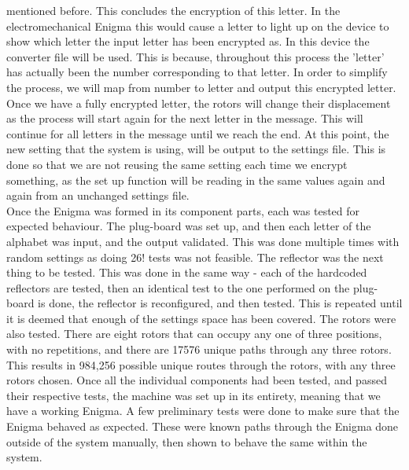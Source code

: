 \documentclass[12pt,a4paper]{article}
\begin{document}
mentioned before. This concludes the encryption of this letter. In the electromechanical Enigma this would cause a letter to light up on the device to show which letter the input letter has been encrypted as. In this device the converter file will be used. This is because, throughout this process the 'letter' has actually been the number corresponding to that letter. In order to simplify the process, we will map from number to letter and output this encrypted letter. Once we have a fully encrypted letter, the rotors will change their displacement as the process will start again for the next letter in the message. This will continue for all letters in the message until we reach the end. At this point, the new setting that the system is using, will be output to the settings file. This is done so that we are not reusing the same setting each time we encrypt something, as the set up function will be reading in the same values again and again from an unchanged settings file.\\

Once the Enigma was formed in its component parts, each was tested for expected behaviour. The plug-board was set up, and then each letter of the alphabet was input, and the output validated. This was done multiple times with random settings as doing 26! tests was not feasible. The reflector was the next thing to be tested. This was done in the same way - each of the hardcoded reflectors are tested, then an identical test to the one performed on the plug-board is done, the reflector is reconfigured, and then tested. This is repeated until it is deemed that enough of the settings space has been covered. The rotors were also tested. There are eight rotors that can occupy any one of three positions, with no repetitions, and there are 17576 unique paths through any three rotors. This results in 984,256 possible unique routes through the rotors, with any three rotors chosen. Once all the individual components had been tested, and passed their respective tests, the machine was set up in its entirety, meaning that we have a working Enigma. A few preliminary tests were done to make sure that the Enigma behaved as expected. These were known paths through the Enigma done outside of the system manually, then shown to behave the same within the system.\\
\end{document}
